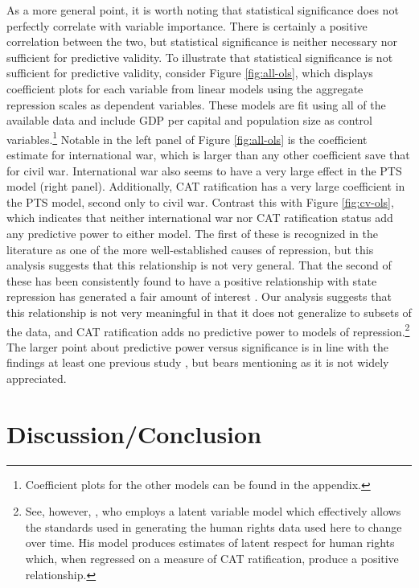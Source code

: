 \documentclass[12pt]{article}
\begin{document}
As a more general point, it is worth noting that statistical significance does not perfectly correlate with variable importance. There is certainly a positive correlation between the two, but statistical significance is neither necessary nor sufficient for predictive validity. To illustrate that statistical significance is not sufficient for predictive validity, consider Figure \ref{fig:all-ols}, which displays coefficient plots for each variable from linear models using the aggregate repression scales as dependent variables. These models are fit using all of the available data and include GDP per capital and population size as control variables.\footnote{Coefficient plots for the other models can be found in the appendix.}  Notable in the left panel of Figure \ref{fig:all-ols} is the coefficient estimate for international war, which is larger than any other coefficient save that for civil war. International war also seems to have a very large effect in the PTS model (right panel). Additionally, CAT ratification has a very large coefficient in the PTS model, second only to civil war. Contrast this with Figure \ref{fig:cv-ols}, which indicates that neither international war nor CAT ratification status add any predictive power to either model. The first of these is recognized in the literature as one of the more well-established causes of repression, but this analysis suggests that this relationship is not very general. That the second of these has been consistently found to have a positive relationship with state repression \citep{Hathaway2002,Neumayer2005,Hill2010} has generated a fair amount of interest \citep[E.g., see]{Vreeland2008,HollyerRosendorff2011}. Our analysis suggests that this relationship is not very meaningful in that it does not generalize to subsets of the data, and CAT ratification adds no predictive power to models of repression.\footnote{See, however, \citet{Fariss2013}, who employs a latent variable model which effectively allows the standards used in generating the human rights data used here to change over time. His model produces estimates of latent respect for human rights which, when regressed on a measure of CAT ratification, produce a positive relationship.} The larger point about predictive power versus significance is in line with the findings at least one previous study \citep{Wardetal2010}, but bears mentioning as it is not widely appreciated.

\section{Discussion/Conclusion}
\end{document}
